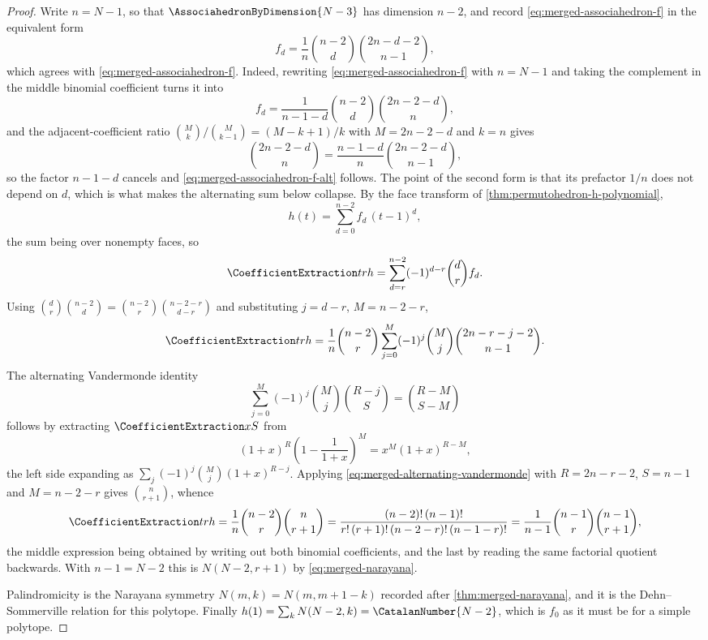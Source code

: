 \documentclass[11pt,a4paper,oneside,openany]{book}
\theoremstyle{definition}
\theoremstyle{remark}
\begin{document}
\begin{proof}
Write $n=N-1$, so that $\AssociahedronByDimension{N-3}$ has dimension $n-2$, and
record \eqref{eq:merged-associahedron-f} in the equivalent form
\begin{equation}
 f_d=\frac1n\binom{n-2}{d}\binom{2n-d-2}{n-1},                    \label{eq:merged-associahedron-f-alt}
\end{equation}
which agrees with \eqref{eq:merged-associahedron-f}.  Indeed, rewriting
\eqref{eq:merged-associahedron-f} with $n=N-1$ and taking the complement in the
middle binomial coefficient turns it into
\[
 f_d=\frac1{n-1-d}\binom{n-2}{d}\binom{2n-2-d}{n},
\]
and the adjacent-coefficient ratio
$\binom Mk\big/\binom M{k-1}=(M-k+1)/k$ with $M=2n-2-d$ and $k=n$ gives
\[
 \binom{2n-2-d}{n}=\frac{n-1-d}{n}\binom{2n-2-d}{n-1},
\]
so the factor $n-1-d$ cancels and \eqref{eq:merged-associahedron-f-alt}
follows.  The point of the second form is that its prefactor $1/n$ does not
depend on $d$, which is what makes the alternating sum below collapse.  By the
face transform of
\cref{thm:permutohedron-h-polynomial},
\[
 h(t)=\sum_{d=0}^{n-2}f_d\,(t-1)^{d},
\]
the sum being over nonempty faces, so
\[
 \CoefficientExtraction tr h=\sum_{d=r}^{n-2}(-1)^{d-r}\binom dr f_d.
\]
Using $\binom dr\binom{n-2}{d}=\binom{n-2}{r}\binom{n-2-r}{d-r}$ and
substituting $j=d-r$, $M=n-2-r$,
\[
 \CoefficientExtraction tr h
 =\frac1n\binom{n-2}{r}\sum_{j=0}^{M}(-1)^j\binom Mj
   \binom{2n-r-j-2}{n-1}.
\]
The alternating Vandermonde identity
\begin{equation}
 \sum_{j=0}^{M}(-1)^j\binom Mj\binom{R-j}{S}=\binom{R-M}{S-M}    \label{eq:merged-alternating-vandermonde}
\end{equation}
follows by extracting $\CoefficientExtraction xS$ from
\[
 (1+x)^R\left(1-\frac1{1+x}\right)^M=x^M(1+x)^{R-M},
\]
the left side expanding as $\sum_j(-1)^j\binom Mj(1+x)^{R-j}$.  Applying
\eqref{eq:merged-alternating-vandermonde} with $R=2n-r-2$, $S=n-1$ and
$M=n-2-r$ gives $\binom{n}{r+1}$, whence
\[
 \CoefficientExtraction tr h=\frac1n\binom{n-2}{r}\binom n{r+1}
 =\frac{(n-2)!\,(n-1)!}{r!\,(r+1)!\,(n-2-r)!\,(n-1-r)!}
 =\frac1{n-1}\binom{n-1}{r}\binom{n-1}{r+1},
\]
the middle expression being obtained by writing out both binomial
coefficients, and the last by reading the same factorial quotient backwards.
With $n-1=N-2$ this is $N(N-2,r+1)$ by \eqref{eq:merged-narayana}.

Palindromicity is the Narayana symmetry $N(m,k)=N(m,m+1-k)$ recorded after
\cref{thm:merged-narayana}, and it is the Dehn--Sommerville relation for this
polytope.  Finally $h(1)=\sum_kN(N-2,k)=\CatalanNumber{N-2}$, which is $f_0$
as it must be for a simple polytope.
\end{proof}
\end{document}
